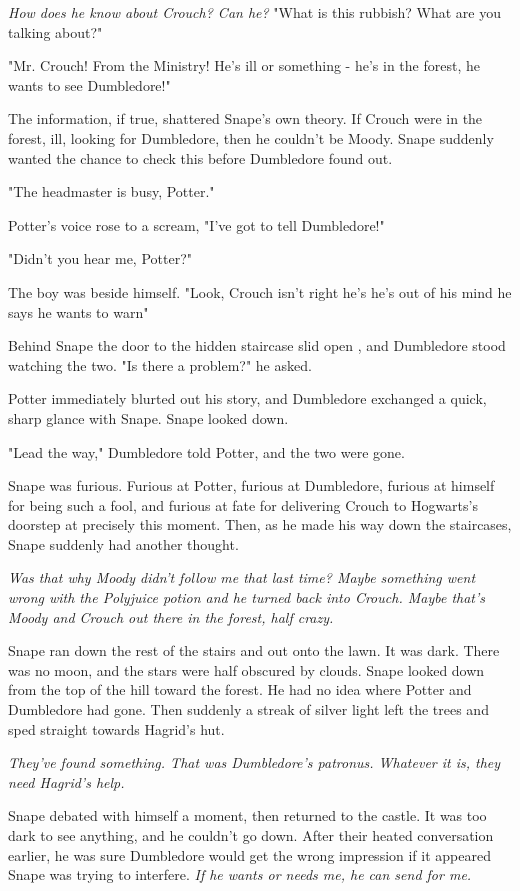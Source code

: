 \emph{How does he know about Crouch? Can he{\el}?} "What is this rubbish? What are you talking about?"

"Mr. Crouch! From the Ministry! He's ill or something - he's in the forest, he wants to see Dumbledore!"

The information, if true, shattered Snape's own theory. If Crouch were in the forest, ill, looking for Dumbledore, then he couldn't be Moody. Snape suddenly wanted the chance to check this before Dumbledore found out.

"The headmaster is busy, Potter."

Potter's voice rose to a scream, "I've got to tell Dumbledore!"

"Didn't you hear me, Potter?"

The boy was beside himself. "Look, Crouch isn't right{\el} he's{\el} he's out of his mind{\el} he says he wants to warn{\el}"

Behind Snape the door to the hidden staircase slid open , and Dumbledore stood watching the two. "Is there a problem?" he asked.

Potter immediately blurted out his story, and Dumbledore exchanged a quick, sharp glance with Snape. Snape looked down.

"Lead the way," Dumbledore told Potter, and the two were gone.

Snape was furious. Furious at Potter, furious at Dumbledore, furious at himself for being such a fool, and furious at fate for delivering Crouch to Hogwarts's doorstep at precisely this moment. Then, as he made his way down the staircases, Snape suddenly had another thought.

\emph{Was that why Moody didn't follow me that last time? Maybe something went wrong with the Polyjuice potion and he turned back into Crouch. Maybe that's Moody and Crouch out there in the forest, half crazy.}

Snape ran down the rest of the stairs and out onto the lawn. It was dark. There was no moon, and the stars were half obscured by clouds. Snape looked down from the top of the hill toward the forest. He had no idea where Potter and Dumbledore had gone. Then suddenly a streak of silver light left the trees and sped straight towards Hagrid's hut.

\emph{They've found something. That was Dumbledore's patronus. Whatever it is, they need Hagrid's help.}

Snape debated with himself a moment, then returned to the castle. It was too dark to see anything, and he couldn't go down. After their heated conversation earlier, he was sure Dumbledore would get the wrong impression if it appeared Snape was trying to interfere. \emph{If he wants or needs me, he can send for me.}

